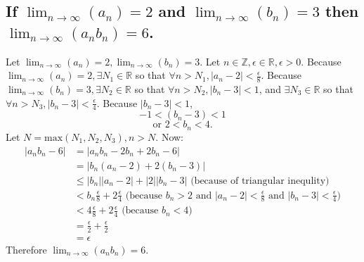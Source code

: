 \documentclass[10pt, letterpaper, titlepage]{article}
\newcommand{\0}{\varnothing}
\newcommand{\Z}{\mathbb{Z}}
\newcommand{\R}{\mathbb{R}}
\newcommand\abs[1]{\left|#1\right|}
\newcommand{\lntinf}{\lim_{n \to \infty}}
\newcommand{\1}{\{ 1 \}}
\newcommand{\2}{\{ (1,1) \}}
\newcommand{\e}{\epsilon}
\newcommand{\an}{a_n}
\newcommand{\bn}{b_n}
\begin{document}
        \subsection{If $\lntinf (a_n) = 2$ and $\lntinf (b_n) = 3$ then $\lntinf (a_n b_n) = 6$.}
            Let $\lntinf (\an) = 2, \lntinf (\bn) = 3$. Let $n \in \Z, \e \in \R, \e > 0$.
            Because $\lntinf (\an) = 2, \exists N_1 \in \R$ so that $\forall n > N_1, \abs{\an - 2} < \frac{\e}{8}$.
            Because $\lntinf (\bn) = 3, \exists N_2 \in \R$ so that $\forall n > N_2, \abs{\bn - 3} < 1$,
            and $\exists N_3 \in \R$ so that $\forall n > N_3, \abs{\bn - 3} < \frac{\e}{4}$.
            Because $\abs{\bn - 3} < 1$, 
            $$-1 < (\bn - 3) < 1$$
            $$\text{or } 2 < \bn < 4.$$
            Let $N = \text{max}(N_1, N_2, N_3), n > N$.
            Now: 
            \begin{align*}
                \abs{\an\bn - 6} &= \abs{\an\bn - 2\bn +2\bn -6}\\
                &= \abs{\bn(\an -2) + 2(\bn -3)}\\
                &\le\abs{\bn}\abs{\an -2} + \abs{2}\abs{\bn-3} \text{ (because of triangular inequlity)}\\
                &< \bn\frac{\e}{8} + 2\frac{\e}{4} \text{ (because $\bn > 2$ and $\abs{\an - 2} < \frac{\e}{8}$ and $\abs{\bn - 3} < \frac{\e}{4}$)}\\
                &<4\frac{\e}{8} + 2\frac{\e}{4} \text{ (because $\bn < 4$)}\\
                &=\frac{\e}{2} + \frac{\e}{2}\\
                &=\e
            \end{align*}
            Therefore $\lntinf (\an\bn) = 6$.

        \newpage
\end{document}

